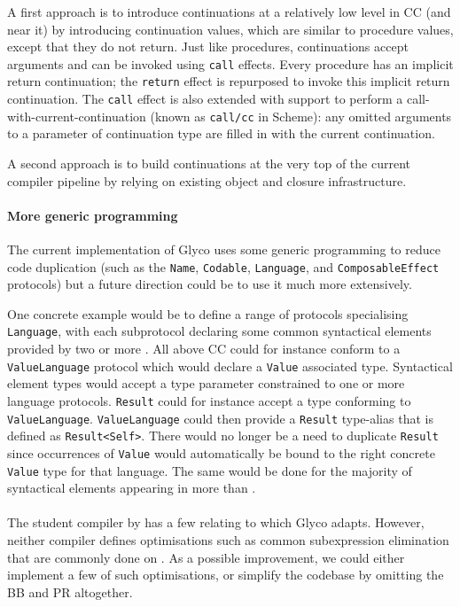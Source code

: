 \documentclass[main.tex]{subfiles}
\begin{document}
A first approach is to introduce continuations at a relatively low level in CC (and  near it) by introducing continuation values, which are similar to procedure values, except that they do not return. Just like procedures, continuations accept arguments and can be invoked using \texttt{call} effects. Every procedure has an implicit return continuation; the \texttt{return} effect is repurposed to invoke this implicit return continuation. The \texttt{call} effect is also extended with support to perform a call-with-current-continuation (known as \texttt{call/cc} in Scheme): any omitted arguments to a parameter of continuation type are filled in with the current continuation.

A second approach is to build continuations at the very top of the current compiler pipeline by relying on existing object and closure infrastructure.

\paragraph{More generic programming} The current implementation of Glyco uses some generic programming to reduce code duplication (such as the \texttt{Name}, \texttt{Codable}, \texttt{Language}, and \texttt{ComposableEffect} protocols) but a future direction could be to use it much more extensively.

One concrete example would be to define a range of protocols specialising \texttt{Language}, with each subprotocol declaring some common syntactical elements provided by two or more . All  above CC could for instance conform to a \texttt{ValueLanguage} protocol which would declare a \texttt{Value} associated type. Syntactical element types would accept a type parameter constrained to one or more language protocols. \texttt{Result} could for instance accept a type conforming to \texttt{ValueLanguage}. \texttt{ValueLanguage} could then provide a \texttt{Result} type-alias that is defined as \texttt{Result<Self>}. There would no longer be a need to duplicate \texttt{Result} since occurrences of \texttt{Value} would automatically be bound to the right concrete \texttt{Value} type for that language. The same would be done for the majority of syntactical elements appearing in more than .

\paragraph{} The student compiler by \citet{compcourse} has a few  relating to  which Glyco adapts. However, neither compiler defines optimisations such as common subexpression elimination that are commonly done on . As a possible improvement, we could either implement a few of such optimisations, or simplify the codebase by omitting the   BB and PR altogether.



\biblio{}
\onlyinsubfile{\glsaddall\printglossaries}
\end{document}
